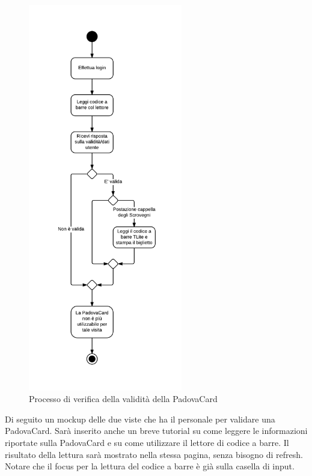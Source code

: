 \begin{figure}[H]
\centering
\includegraphics[width=0.6\textwidth]{images/validazione_padovacard.png}
\caption{Processo di verifica della validità della PadovaCard}
\end{figure}


Di seguito un mockup delle due viste che ha il personale per validare una PadovaCard. Sarà inserito anche un breve tutorial su come leggere le informazioni riportate sulla PadovaCard e su come utilizzare il lettore di codice a barre. Il risultato della lettura sarà mostrato nella stessa pagina, senza bisogno di refresh.
Notare che il focus per la lettura del codice a barre è già sulla casella di input. \\

